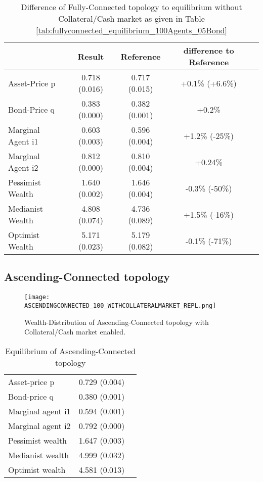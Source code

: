\documentclass[Bachelorarbeit.tex]{subfiles}
\begin{document}
\begin{table}[H]
	\caption{Difference of Fully-Connected topology to equilibrium without Collateral/Cash market as given in Table \ref{tab:fullyconnected_equilibrium_100Agents_05Bond}}
	\centering
	\begin{tabular} { l c c c r }
		& Result & Reference & difference to Reference \\
		\hline
		Asset-Price p & 0.718 (0.016) & 0.717 (0.015) & +0.1\% (+6.6\%) \\
		Bond-Price q & 0.383 (0.000) & 0.382 (0.001) & +0.2\%  \\
		Marginal Agent i1 & 0.603 (0.003) & 0.596 (0.004) & +1.2\% (-25\%) \\
		Marginal Agent i2 & 0.812 (0.000) & 0.810 (0.004) & +0.24\% \\
		\hline
		Pessimist Wealth & 1.640 (0.002) & 1.646 (0.004) & -0.3\% (-50\%) \\
		Medianist Wealth & 4.808 (0.074) & 4.736 (0.089) & +1.5\% (-16\%) \\
		Optimist Wealth & 5.171 (0.023) & 5.179 (0.082) & -0.1\% (-71\%) \\
		\hline
	\end{tabular}
\end{table} 

\subsection{Ascending-Connected topology}
\begin{figure}[H]
	\centering
  \texttt{[image: ASCENDINGCONNECTED\_100\_WITHCOLLATERALMARKET\_REPL.png]}
	\caption{Wealth-Distribution of Ascending-Connected topology with Collateral/Cash market enabled.}
	\label{fig:wealth_ASCENDINGCONNECTED_100_WITHCOLLATERALMARKET_REPL}
\end{figure}

\begin{table}[H]
	\caption{Equilibrium of Ascending-Connected topology}
	\centering
	\begin{tabular} { l c r }
		\hline
		Asset-price p & 0.729 (0.004) \\
		Bond-price q & 0.380 (0.001) \\
		Marginal agent i1 & 0.594 (0.001) \\
		Marginal agent i2 & 0.792 (0.000) \\
		\hline
		Pessimist wealth & 1.647 (0.003) \\
		Medianist wealth & 4.999 (0.032) \\
		Optimist wealth & 4.581 (0.013) \\
		\hline
	\end{tabular}
\end{table} 
\end{document}
